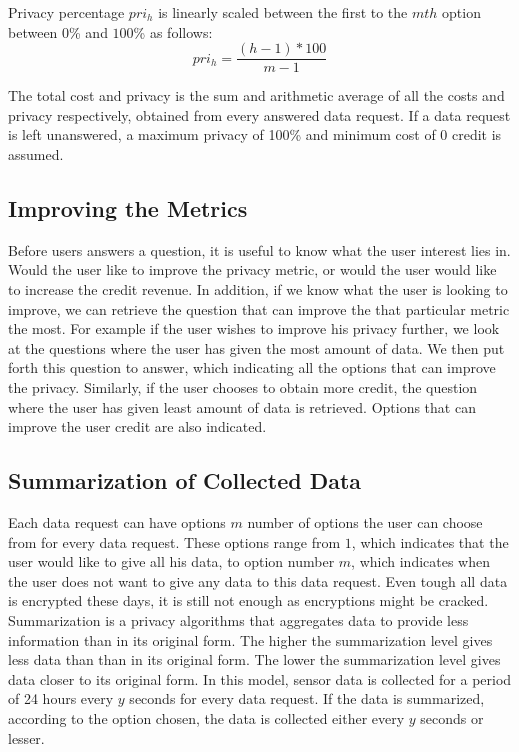 Privacy percentage $pri_{h}$ is linearly scaled between the first to the $mth$ option between $0$\% and $100$\% as follows:
\begin{equation}
pri_{h} = \frac{(h-1) * 100}{m-1}
\end{equation}

The total cost and privacy is the sum and arithmetic average of all the costs and privacy respectively, obtained from every answered data request. If a data request is left unanswered, a maximum privacy of 100\% and minimum cost of 0 credit is assumed.


\subsection{Improving the Metrics}
Before users answers a question, it is useful to know what the user interest lies in. Would the user like to improve
the privacy metric, or would the user would like to increase the credit revenue. In addition, if we know what the user is looking to improve, we can retrieve the question that can improve the that particular metric the most.
For example if the user wishes to improve his privacy further, we look at the questions where the user has given the most amount of data. We then put forth this question to answer, which indicating all the options that can improve the privacy. Similarly, if the user chooses to obtain more credit, the question where the user has given least amount of data is retrieved. Options that can improve the user credit are also indicated.


\subsection{Summarization of Collected Data} \label{summa}
Each data request can have options $m$ number of options the user can choose from for every data request. These options range from $1$, which indicates that the user would like to give all his data, to option number $m$, which indicates when the user does not want to give any data to this data request. Even tough all data is encrypted these days, it is still not enough as encryptions might be cracked. Summarization is a privacy algorithms that aggregates data to provide less information than in its original form. The higher the summarization level gives less data than than in its original form. The lower the summarization level gives data closer to its original form. In this model, sensor data is collected for a period of 24 hours every $y$ seconds for every data request. If the data is summarized, according to the option chosen, the data is collected either every $y$ seconds or lesser.


